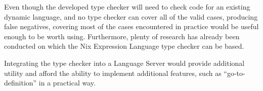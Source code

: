 \documentclass[a4paper,conference]{IEEEtran}
\begin{document}
Even though the developed type checker will need to check code for an existing dynamic language, and no type checker can cover all of the valid cases, producing false negatives, covering most of the cases encountered in practice would be useful enough to be worth using. Furthermore, plenty of research has already been conducted on which the Nix Expression Language type checker can be based.

Integrating the type checker into a Language Server would provide additional utility and afford the ability to implement additional features, such as ``go-to-definition'' in a practical way.





\begin{flushright}
  \vspace{1cm}
\end{flushright}
\end{document}

